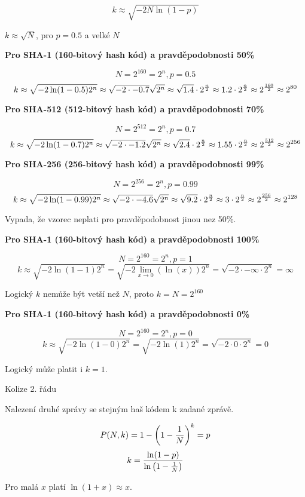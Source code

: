 $$k \approx \sqrt{-2N\ln(1 - p)}$$
\centerline
{$k \approx \sqrt{N}$, pro $p = 0.5$ a velké $N$}

\bigskip\centerline
{\bf Pro SHA-1 (160-bitový hash kód) a pravděpodobnosti 50\%}

$$N = 2^{160} = 2^n, p = 0.5$$
$$
k \approx \sqrt{-2 \ln(1 - 0.5) 2^n} \approx \sqrt{-2 \cdot -0.7}\sqrt{2^n}
\approx \sqrt{1.4} \cdot 2^{n \over 2} \approx 1.2 \cdot 2^{n \over 2}
\approx 2^{160 \over 2} \approx 2^{80}
$$

\bigskip\centerline
{\bf Pro SHA-512 (512-bitový hash kód) a pravděpodobnosti 70\%}

$$N = 2^{512} = 2^n, p = 0.7$$
$$
k \approx \sqrt{-2 \ln(1 - 0.7) 2^n} \approx \sqrt{-2 \cdot -1.2}\sqrt{2^n}
\approx \sqrt{2.4} \cdot 2^{n \over 2} \approx 1.55 \cdot 2^{n \over 2}
\approx 2^{512 \over 2} \approx 2^{256}
$$

\bigskip\centerline
{\bf Pro SHA-256 (256-bitový hash kód) a pravděpodobnosti 99\%}

$$N = 2^{256} = 2^n, p = 0.99$$
$$
k \approx \sqrt{-2 \ln(1 - 0.99) 2^n} \approx \sqrt{-2 \cdot -4.6}\sqrt{2^n}
\approx \sqrt{9.2} \cdot 2^{n \over 2} \approx 3 \cdot 2^{n \over 2}
\approx 2^{256 \over 2} \approx 2^{128}
$$

\centerline{Vypada, že vzorec neplati pro pravděpodobnost jinou nez 50\%.}

\bigskip\centerline
{\bf Pro SHA-1 (160-bitový hash kód) a pravděpodobnosti 100\%}

$$N = 2^{160} = 2^n, p = 1$$
$$
k \approx \sqrt{-2 \ln(1 - 1) 2^n} = \sqrt{-2 \lim_{x \rightarrow 0} {(\ln(x))} 2^n}
= \sqrt{-2 \cdot -\infty \cdot 2^n} = \infty
$$

\centerline{Logický $k$ nemůže být vetší než $N$, proto $k = N = 2^{160}$}

\bigskip\centerline
{\bf Pro SHA-1 (160-bitový hash kód) a pravděpodobnosti 0\%}

$$N = 2^{160} = 2^n, p = 0$$
$$
k \approx \sqrt{-2 \ln(1 - 0) 2^n} = \sqrt{-2 \ln(1) 2^n}
= \sqrt{-2 \cdot 0 \cdot 2^n} = 0
$$

\centerline{Logický může platit i $k = 1$.}

\sec Kolize 2. řádu

Nalezení druhé zprávy se stejným haš kódem k zadané zprávě.

$$P(N,k) = 1 - \left( 1 - {1 \over N} \right)^k = p$$
$$k = {\ln(1 - p) \over \ln\left(1 - {1 \over N}\right)}$$

\centerline{Pro malá $x$ platí $\ln(1 + x) \approx x$.}

